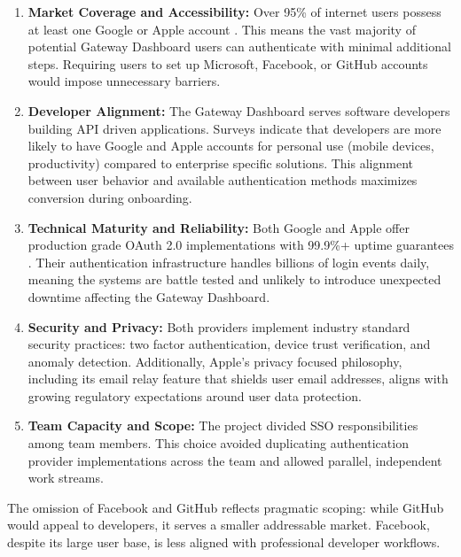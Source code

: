 \begin{enumerate}
    \item \textbf{Market Coverage and Accessibility:} Over 95\% of internet users possess at least one Google or Apple account \cite{statista2023accounts, statcounter2023mobile}. This means the vast majority of potential Gateway Dashboard users can authenticate with minimal additional steps. Requiring users to set up Microsoft, Facebook, or GitHub accounts would impose unnecessary barriers.

    \item \textbf{Developer Alignment:} The Gateway Dashboard serves software developers building API driven applications. Surveys indicate that developers are more likely to have Google and Apple accounts for personal use (mobile devices, productivity) compared to enterprise specific solutions. This alignment between user behavior and available authentication methods maximizes conversion during onboarding.

    \item \textbf{Technical Maturity and Reliability:} Both Google and Apple offer production grade OAuth 2.0 implementations with 99.9\%+ uptime guarantees \cite{google2023oauth, apple2023signin}. Their authentication infrastructure handles billions of login events daily, meaning the systems are battle tested and unlikely to introduce unexpected downtime affecting the Gateway Dashboard.

    \item \textbf{Security and Privacy:} Both providers implement industry standard security practices: two factor authentication, device trust verification, and anomaly detection. Additionally, Apple's privacy focused philosophy, including its email relay feature that shields user email addresses, aligns with growing regulatory expectations around user data protection.

    \item \textbf{Team Capacity and Scope:} The project divided SSO responsibilities among team members. This choice avoided duplicating authentication provider implementations across the team and allowed parallel, independent work streams.
\end{enumerate}

The omission of Facebook and GitHub reflects pragmatic scoping: while GitHub would appeal to developers, it serves a smaller addressable market. Facebook, despite its large user base, is less aligned with professional developer workflows.

